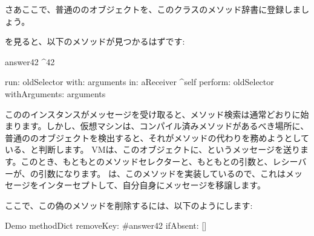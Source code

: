 \documentclass[a4paper,10pt,twoside]{book}
\begin{document}
さあここで、普通の\st{}のオブジェクトを、このクラスのメソッド辞書に登録しましょう。

\dothis{\lct{Demo methodDict at: \#answer42 put: ObjectsAsMethodsExample new.}を評価しましょう。
さて、もういちど\ct{Demo new answer42}.の結果をprintしてみましょう。今度は、\ct{42}が得られます。}

を見ると、以下のメソッドが見つかるはずです:
\begin{code}{}
answer42
	^42

run: oldSelector with: arguments in: aReceiver
	^self perform: oldSelector withArguments: arguments
\end{code}

こののインスタンスがメッセージを受け取ると、メソッド検索は通常どおりに始まります。しかし、仮想マシンは、コンパイル済みメソッドがあるべき場所に、普通の\st{}のオブジェクトを検出すると、それがメソッドの代わりを務めようとしている、と判断します。%
VMは、このオブジェクトに、というメッセージを送ります。このとき、もともとのメソッドセレクターと、もともとの引数と、レシーバーが、の引数になります。%
は、このメソッドを実装しているので、これはメッセージをインターセプトして、自分自身にメッセージを移譲します。

ここで、この偽のメソッドを削除するには、以下のようにします:
\begin{code}{}
Demo methodDict removeKey: #answer42 ifAbsent: []
\end{code}
\end{document}
